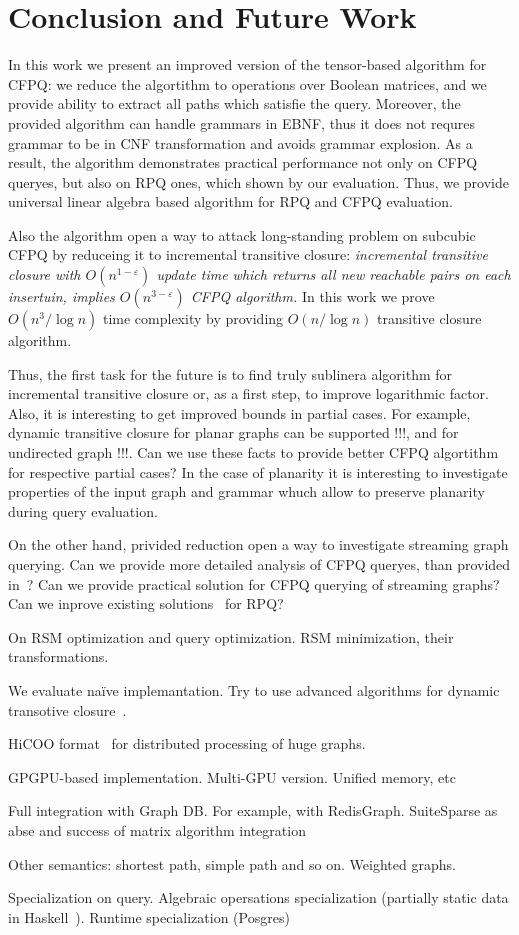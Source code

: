 \section{Conclusion and Future Work}

In this work we present an improved version of the tensor-based algorithm for CFPQ: we reduce the algortithm to operations over Boolean matrices, and we provide ability to extract all paths which satisfie the query.
Moreover, the provided algorithm can handle grammars in EBNF, thus it does not requres grammar to be in CNF transformation and avoids grammar explosion.
As a result, the algorithm demonstrates practical performance not only on CFPQ queryes, but also on RPQ ones, which shown by our evaluation. 
Thus, we provide universal linear algebra based algorithm for RPQ and CFPQ evaluation.

Also the algorithm open a way to attack long-standing problem on subcubic CFPQ by reduceing it to incremental transitive closure: \textit{incremental transitive closure with $O(n^{1-\varepsilon})$ update time which returns all new reachable pairs on each insertuin, implies $O(n^{3-\varepsilon})$ CFPQ algorithm.}
In this work we prove $O(n^3/\log{n})$ time complexity by providing $O(n/\log{n})$ transitive closure algorithm.

Thus, the first task for the future is to find truly sublinera algorithm for incremental transitive closure or, as a first step, to improve logarithmic factor.
Also, it is interesting to get improved bounds in partial cases.
For example, dynamic transitive closure for planar graphs can be supported !!!, and for undirected graph !!!. Can we use these facts to provide better CFPQ algortithm for respective partial cases? 
In the case of planarity it is interesting to investigate properties of the input graph and grammar whuch allow to preserve planarity during query evaluation.


On the other hand, privided reduction open a way to investigate streaming graph querying.
Can we provide more detailed analysis of CFPQ queryes, than provided in~\cite{!!!}?
Can we provide practical solution for CFPQ querying of streaming graphs?
Can we inprove existing solutions~\cite{Pacaci2020RegularPQ} for RPQ?


On RSM optimization and query optimization. RSM minimization, their transformations.

We evaluate na{\"i}ve implemantation. Try to use advanced algorithms for dynamic transotive closure~\cite{cs6345}.

HiCOO format~\cite{!!!} for distributed processing of huge graphs.

GPGPU-based implementation. Multi-GPU version. Unified memory, etc~\cite{!!!}

Full integration with Graph DB.
For example, with RedisGraph.
SuiteSparse as abse and success of matrix algorithm integration~\cite{!!!}

Other semantics: shortest path, simple path and so on. 
Weighted graphs.

Specialization on query.
Algebraic opersations specialization (partially static data in Haskell~\cite{!!!}).
Runtime specialization (Posgres)~\cite{!!!}

